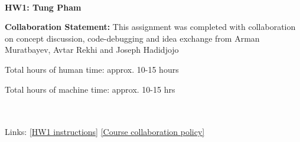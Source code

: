 \documentclass[10pt]{article}
\begin{document}
~~\\ %

{\Large{\bf HW1: Tung Pham }}

\Large{\bf Collaboration Statement:} This assignment was completed with
collaboration on concept discussion, code-debugging and idea exchange from Arman
Muratbayev, Avtar Rekhi and Joseph Hadidjojo

Total hours of human time: approx. 10-15 hours

Total hours of machine time: approx. 10-15 hrs


~~\\
~~\\
Links: 
\href{https://www.cs.tufts.edu/cs/152L3D/2024f/hw1.html}{[HW1 instructions]} 
\href{https://www.cs.tufts.edu/cs/152L3D/2024f/index.html#collaboration}{[Course collaboration policy]} 

\setcounter{tocdepth}{2}
\tableofcontents

\newpage
\end{document}
